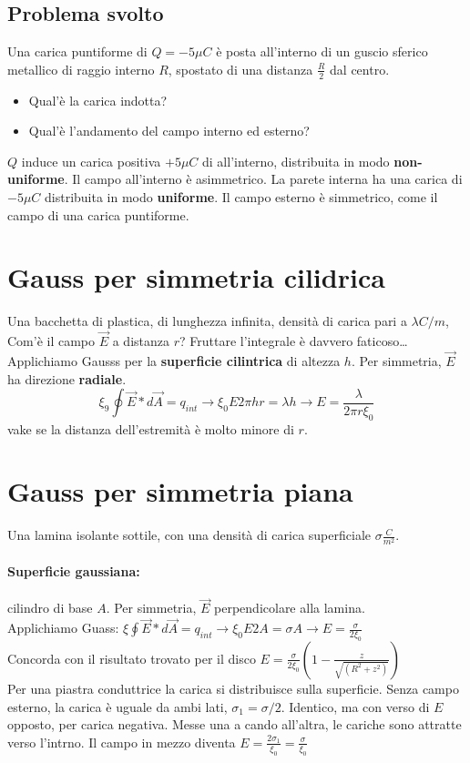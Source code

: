 \subsection{Problema svolto}
Una carica puntiforme di $Q=-5\mu C$ è posta all'interno di un guscio sferico metallico di raggio interno $R$, spostato di una distanza $\frac{R}{2}$ dal centro.
\begin{itemize}
\item Qual'è la carica indotta?
\item Qual'è l'andamento del campo interno ed esterno?
\end{itemize}
$Q$ induce un carica positiva $+5\mu C$ di all'interno, distribuita in modo \textbf{non-uniforme}.
Il campo all'interno è asimmetrico. La parete interna ha una carica di $-5\mu C$ distribuita in modo \textbf{uniforme}. Il campo esterno è simmetrico, come il campo di una carica puntiforme.
\section{Gauss per simmetria cilidrica}
Una bacchetta di plastica, di lunghezza infinita, densità di carica pari a $\lambda C/m$, Com'è il campo $\vec{E}$ a distanza $r$? Fruttare l'integrale è davvero faticoso\dots Applichiamo Gausss per la \textbf{superficie cilintrica} di altezza $h$. Per simmetria, $\vec{E}$ ha direzione \textbf{radiale}.
\begin{equation}
\xi_9\oint \vec{E}*d\vec{A}=q_{int}\to \xi_0 E2\pi hr=\lambda h\to E=\frac{\lambda}{2\pi r\xi_0}
\end{equation}
vake se la distanza dell'estremità è molto minore di $r$.
\section{Gauss per simmetria piana}
Una lamina isolante sottile, con una densità di carica superficiale $\sigma \frac{C}{m^2}$.
\paragraph{Superficie gaussiana:} cilindro di base $A$. Per simmetria, $\vec{E}$ perpendicolare alla lamina.\\ Applichiamo Guass: $\xi \oint \vec{E}*d\vec{A}=q_{int} \to \xi_0E2A=\sigma A\to E=\frac{\sigma}{2\xi_0}$\\
Concorda con il risultato trovato per il disco $E=\frac{\sigma}{2\xi_0}\left(1-\frac{z}{\sqrt{(R^2+z^2)}}\right)$\\
Per una piastra conduttrice la carica si distribuisce sulla superficie. Senza campo esterno, la carica è uguale da ambi lati, $\sigma_1=\sigma/2$. Identico, ma con verso di $E$ opposto, per carica negativa. Messe una a cando all'altra, le cariche sono attratte verso l'intrno. Il campo in mezzo diventa $E=\frac{2\sigma_1}{\xi_0}=\frac{\sigma}{\xi_0}$
